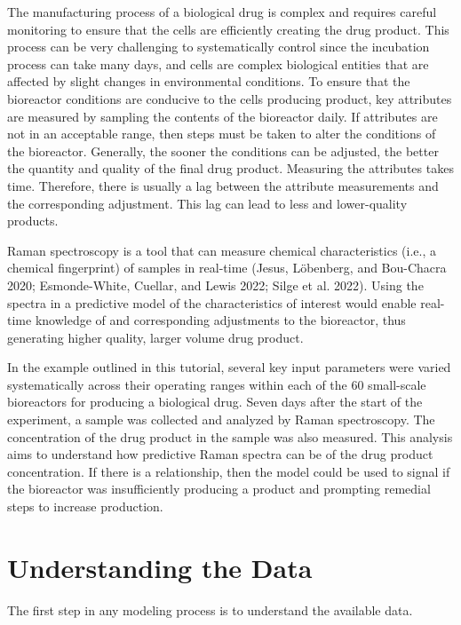 \documentclass[
  letterpaper,
  DIV=11,
  numbers=noendperiod]{scrartcl}
\begin{document}
The manufacturing process of a biological drug is complex and requires
careful monitoring to ensure that the cells are efficiently creating the
drug product. This process can be very challenging to systematically
control since the incubation process can take many days, and cells are
complex biological entities that are affected by slight changes in
environmental conditions. To ensure that the bioreactor conditions are
conducive to the cells producing product, key attributes are measured by
sampling the contents of the bioreactor daily. If attributes are not in
an acceptable range, then steps must be taken to alter the conditions of
the bioreactor. Generally, the sooner the conditions can be adjusted,
the better the quantity and quality of the final drug product. Measuring
the attributes takes time. Therefore, there is usually a lag between the
attribute measurements and the corresponding adjustment. This lag can
lead to less and lower-quality products.

Raman spectroscopy is a tool that can measure chemical characteristics
(i.e., a chemical fingerprint) of samples in real-time (Jesus,
Löbenberg, and Bou-Chacra 2020; Esmonde-White, Cuellar, and Lewis 2022;
Silge et al. 2022). Using the spectra in a predictive model of the
characteristics of interest would enable real-time knowledge of and
corresponding adjustments to the bioreactor, thus generating higher
quality, larger volume drug product.

In the example outlined in this tutorial, several key input parameters
were varied systematically across their operating ranges within each of
the 60 small-scale bioreactors for producing a biological drug. Seven
days after the start of the experiment, a sample was collected and
analyzed by Raman spectroscopy. The concentration of the drug product in
the sample was also measured. This analysis aims to understand how
predictive Raman spectra can be of the drug product concentration. If
there is a relationship, then the model could be used to signal if the
bioreactor was insufficiently producing a product and prompting remedial
steps to increase production.

\hypertarget{sec-understanding-the-data}{%
\section{Understanding the Data}\label{sec-understanding-the-data}}

The first step in any modeling process is to understand the available
data.
\end{document}

